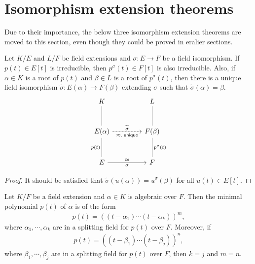 \section{Isomorphism extension theorems}

Due to their importance, the below three isomorphism extension theorems are moved to this section, even though they could be proved in eralier sections.

\begin{thm}\label{iet 1}
    Let $K/E$ and $L/F$ be field extensions and $\sigma: E\rightarrow F$ be a field isomorphism.
    If $p(t)\in E[t]$ is irreducible, then $p^\sigma(t)\in F[t]$ is also irreducible.
    Also, if $\alpha\in K$ is a root of $p(t)$ and $\beta\in L$ is a root of $p^\sigma(t)$, then there is a unique field isomorphism $\widetilde{\sigma}: E(\alpha)\rightarrow F(\beta)$ extending $\sigma$ such that $\widetilde{\sigma}(\alpha)=\beta$.
    \begin{equation*}
        \begin{tikzcd}[row sep=1.0cm, column sep=1.5cm]
            K   &   L\\
            E(\alpha)\arrow[u, dash]\arrow[r, "\widetilde{\sigma}", "\approx\textsf{, unique}"', dashed]
            &
            F(\beta)\arrow[u, dash]\\
            E\arrow[u, , "p(t)", dash]\arrow[r, "\approx", "\sigma"']
            &
            F\arrow[u, "p^\sigma(t)"', dash]
        \end{tikzcd}
    \end{equation*}
\end{thm}
\begin{proof}
    \color{brown}It should be satisfied that $\widetilde{\sigma}(u(\alpha))=u^\sigma(\beta)$ for all $u(t)\in E[t]$.\color{black}
\end{proof}
\begin{cor}\label{form of min.poly.}
    Let $K/F$ be a field extension and $\alpha\in K$ is algebraic over $F$.
    Then the minimal polynomial $p(t)$ of $\alpha$ is of the form
    \begin{align*}
        p(t)=\left((t-\alpha_1)\cdots(t-\alpha_k)\right)^m,
    \end{align*}
    where $\alpha_1, \cdots, \alpha_k$ are in a splitting field for $p(t)$ over $F$.
    Moreover, if
    \begin{align*}
        p(t)=\left((t-\beta_1)\cdots(t-\beta_j)\right)^n,
    \end{align*}
    where $\beta_1, \cdots, \beta_j$ are in a splitting field for $p(t)$ over $F$, then $k=j$ and $m=n$.
\end{cor}
